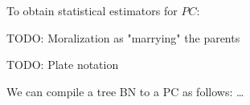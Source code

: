 \documentclass{article}
\begin{document}
To obtain statistical estimators for $PC$:

TODO: Moralization as "marrying" the parents

TODO: Plate notation


We can compile a tree BN to a PC as follows: \ldots





\end{document}
